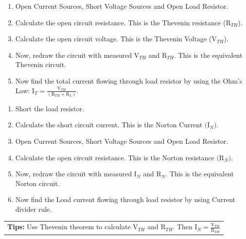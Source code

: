 \documentclass[12pt]{article}
\begin{document}
\begin{enumerate}[itemsep=0ex]
   \item Open Current Sources, Short Voltage Sources and Open Load Resistor.
   \item Calculate the open circuit resistance. This is the Thevenin resistance (R$_{TH}$).
   \item Calculate the open circuit voltage. This is the Thevenin Voltage (V$_{TH}$).
   \item Now, redraw the circuit with measured V$_{TH}$ and R$_{TH}$. This is the equivalent Thevenin circuit.
   \item Now find the total current flowing through load resistor by using the Ohm's Law: $\text{I}_T = \frac{\text{V}_{TH}}{(\text{R}_{TH}+\text{R}_L)}$.
\end{enumerate}

\begin{enumerate}[itemsep=0ex]
   \item Short the load resistor.
   \item Calculate the short circuit current. This is the Norton Current $($I$_{N})$.
   \item Open Current Sources, Short Voltage Sources and Open Load Resistor.
   \item Calculate the open circuit resistance. This is the Norton resistance $($R$_{N})$.
   \item Now, redraw the circuit with measured I$_{N}$ and R$_{N}$. This is the equivalent Norton circuit.
   \item Now find the Load current flowing through load resistor by using Current divider rule.
\end{enumerate}

\hspace{1ex}
\begin{tabular}{l}
\textbf{Tips:} Use Thevenin theorem to calculate V$_{TH}$ and R$_{TH}$. Then $\text{I}_{N} = \frac{\text{V}_{TH}}{\text{R}_{TH}}$
\end{tabular}

 
\pagebreak
\vspace*{-\baselineskip}
\vspace{-0.75\baselineskip}
\end{document}
